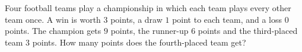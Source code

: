 Four football teams play a championship in which each team plays every other team once. A win is worth $3$ points, a draw $1$ point to each team, and a loss $0$ points. The champion gets $9$ points, the runner-up $6$ points and the third-placed team $3$ points. How many points does the fourth-placed team get?
